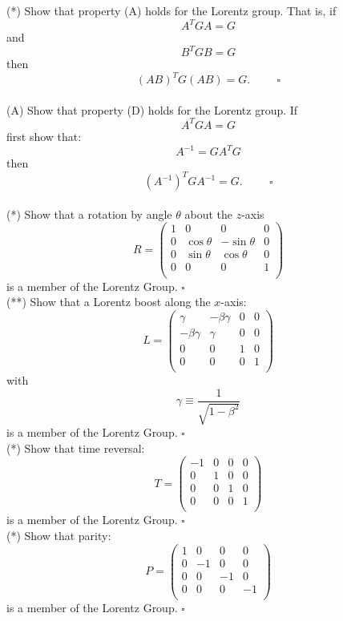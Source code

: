 \documentclass[12pt]{article}
\begin{document}
\exercise (*) Show that property (A) holds for the Lorentz group.  That is, if
$$A^T G A = G$$
and
$$B^T G B = G$$
then
$$(AB)^T G (AB) = G. \hspace{1cm} \square$$
\\

\exercise (A) Show that property (D) holds for the Lorentz group.  If 
$$A^T G A = G$$
first show that:
$$A^{-1} = G A^T G$$
then 
$$(A^{-1})^T G A^{-1} = G. \hspace{1cm} \square$$ 
\\

\exercise (*) Show that a rotation by angle $\theta$ about the $z$-axis
$$R = \begin{pmatrix}
  1 & 0 & 0 & 0 \\[3pt]
  0 & \cos\theta & -\sin\theta & 0 \\[3pt]
  0 &\sin\theta & \cos\theta & 0 \\[3pt]
  0 & 0 & 0 & 1 \\
\end{pmatrix}$$
is a member of the Lorentz Group. $\square$\\[3pt]

\exercise (**) Show that a Lorentz boost along the $x$-axis:
$$L = \begin{pmatrix}
  \gamma & -\beta\gamma & 0 & 0 \\[3pt]
  -\beta\gamma & \gamma & 0 & 0 \\[3pt]
  0 &0 & 1 & 0 \\[3pt]
  0 & 0 & 0 & 1 \\
\end{pmatrix}$$
with
$$\gamma \equiv \frac{1}{\sqrt{1-\beta^2}}$$
is a member of the Lorentz Group. $\square$\\[3pt]

\exercise (*) Show that time reversal:
$$T = \begin{pmatrix}
  -1 & 0 & 0 & 0 \\[3pt]
  0  & 1 & 0 & 0 \\[3pt]
  0  & 0 & 1 & 0 \\[3pt]
  0  & 0 & 0 & 1 \\
\end{pmatrix}$$
is a member of the Lorentz Group. $\square$\\[3pt]

\exercise (*) Show that parity:
$$P = \begin{pmatrix}
  1 &  0 &  0 &  0 \\[3pt]
  0 & -1 &  0 &  0 \\[3pt]
  0 &  0 & -1 &  0 \\[3pt]
  0 &  0 &  0 & -1 \\
\end{pmatrix}$$
is a member of the Lorentz Group. $\square$\\[3pt]
\end{document}
